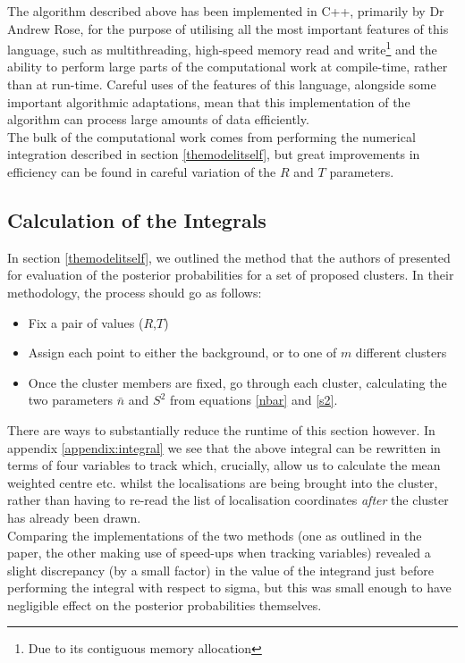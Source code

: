 \documentclass[11pt]{article}
\begin{document}
The algorithm described above has been implemented in C++, primarily by Dr Andrew Rose, for the purpose of utilising all the most important features of this language, such as multithreading, high-speed memory read and write\footnote{Due to its contiguous memory allocation} and the ability to perform large parts of the computational work at compile-time, rather than at run-time. Careful uses of the features of this language, alongside some important algorithmic adaptations, mean that this implementation of the algorithm can process large amounts of data efficiently.  \\


The bulk of the computational work comes from performing the numerical integration described in section \ref{themodelitself}, but great improvements in efficiency can be found in careful variation of the $R$ and $T$ parameters. \\

\subsection{Calculation of the Integrals}

In section \ref{themodelitself}, we outlined the method that the authors of \cite{Rubin-Delanchy2015} presented for evaluation of the posterior probabilities for a set of proposed clusters. In their methodology, the process should go as follows:
\begin{itemize}
	\item Fix a pair of values ($R$,$T$)
	\item Assign each point to either the background, or to one of $m$ different clusters
	\item Once the cluster members are fixed, go through each cluster, calculating the two parameters $\bar{n}$ and $S^2$ from equations \ref{nbar} and \ref{s2}.
\end{itemize}

There are ways to substantially reduce the runtime of this section however. In appendix \ref{appendix:integral} we see that the above integral can be rewritten in terms of four variables to track which, crucially, allow us to calculate the mean weighted centre etc. whilst the localisations are being brought into the cluster, rather than having to re-read the list of localisation coordinates \textit{after} the cluster has already been drawn.\\

Comparing the implementations of the two methods (one as outlined in the paper, the other making use of speed-ups when tracking variables) revealed a slight discrepancy (by a small factor) in the value of the integrand just before performing the integral with respect to sigma, but this was small enough to have negligible effect on the posterior probabilities themselves.
\end{document}
